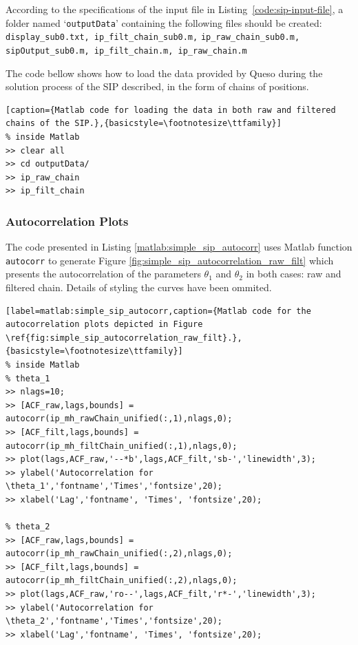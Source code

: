 According to the specifications of the input file in Listing~\ref{code:sip-input-file}, a folder named `\verb+outputData+' containing the following files should be created: \verb+display_sub0.txt, ip_filt_chain_sub0.m,+ \verb+ip_raw_chain_sub0.m, sipOutput_sub0.m, ip_filt_chain.m, ip_raw_chain.m+


The code bellow shows how to load the data provided by Queso during the solution process of the SIP described, in the form of 
chains of positions.

\begin{lstlisting}[caption={Matlab code for loading the data in both raw and filtered chains of the SIP.},{basicstyle=\footnotesize\ttfamily}]
% inside Matlab
>> clear all
>> cd outputData/
>> ip_raw_chain
>> ip_filt_chain
\end{lstlisting}


\subsubsection{Autocorrelation Plots}

The code presented in Listing \ref{matlab:simple_sip_autocorr} uses Matlab function \verb+autocorr+ to generate Figure \ref{fig:simple_sip_autocorrelation_raw_filt}
which presents the autocorrelation of the parameters $\theta_1$ and $\theta_2$ in both cases: raw and filtered chain. Details
of styling the curves have been ommited.



\begin{lstlisting}[label=matlab:simple_sip_autocorr,caption={Matlab code for the autocorrelation plots depicted in Figure \ref{fig:simple_sip_autocorrelation_raw_filt}.},{basicstyle=\footnotesize\ttfamily}]
% inside Matlab
% theta_1
>> nlags=10;
>> [ACF_raw,lags,bounds] = autocorr(ip_mh_rawChain_unified(:,1),nlags,0);
>> [ACF_filt,lags,bounds] = autocorr(ip_mh_filtChain_unified(:,1),nlags,0);
>> plot(lags,ACF_raw,'--*b',lags,ACF_filt,'sb-','linewidth',3);
>> ylabel('Autocorrelation for \theta_1','fontname','Times','fontsize',20);
>> xlabel('Lag','fontname', 'Times', 'fontsize',20);

% theta_2
>> [ACF_raw,lags,bounds] = autocorr(ip_mh_rawChain_unified(:,2),nlags,0);
>> [ACF_filt,lags,bounds] = autocorr(ip_mh_filtChain_unified(:,2),nlags,0);
>> plot(lags,ACF_raw,'ro--',lags,ACF_filt,'r*-','linewidth',3);
>> ylabel('Autocorrelation for \theta_2','fontname','Times','fontsize',20);
>> xlabel('Lag','fontname', 'Times', 'fontsize',20);
\end{lstlisting}

